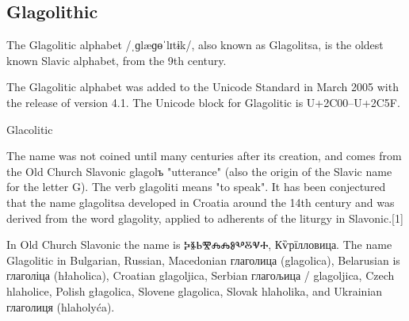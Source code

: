 \subsection{Glagolithic}

The Glagolitic alphabet /ˌɡlæɡɵˈlɪtɨk/, also known as Glagolitsa, is the oldest known Slavic alphabet, from the 9th century.

The Glagolitic alphabet was added to the Unicode Standard in March 2005 with the release of version 4.1.
The Unicode block for Glagolitic is U+2C00–U+2C5F.

\newfontfamily{}

\begin{scriptexample}[]{Glacolitic}

\end{scriptexample}
The name was not coined until many centuries after its creation, and comes from the Old Church Slavonic glagolъ "utterance" (also the origin of the Slavic name for the letter G). The verb glagoliti means "to speak". It has been conjectured that the name glagolitsa developed in Croatia around the 14th century and was derived from the word glagolity, applied to adherents of the liturgy in Slavonic.[1]

In Old Church Slavonic the name is ⰍⰫⰓⰊⰎⰎⰑⰂⰋⰜⰀ, Кѷрїлловица.
The name Glagolitic in Bulgarian, Russian, Macedonian глаголица (glagolica), Belarusian is глаголіца (hłaholica), Croatian glagoljica, Serbian глагољица / glagoljica, Czech hlaholice, Polish głagolica, Slovene glagolica, Slovak hlaholika, and Ukrainian глаголиця (hlaholyća).